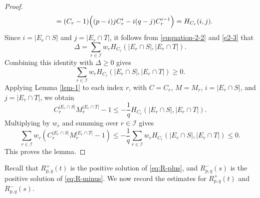 \documentclass[twoside,12pt]{article}
\numberwithin{equation}{section}
\begin{document}
\begin{proof}
\begin{equation}
\begin{aligned}
        &\qquad =
        (C_r-1)
        \Bigl((p-i)jC_r^i-i(q-j)C_r^{i-1}\Bigr)
        =
        H_{C_r}(i,j).
\end{aligned}
\end{equation}
Since $i=|E_r\cap S|$ and $j=|E_r\cap T|$, it follows from \eqref{euquation-2-2} and \eqref{e2-3} that 
$$\Delta
        =
        \sum_{r\in\mathcal I}
        w_r
        H_{C_r}(|E_r\cap S|,|E_r\cap T|).$$
Combining this identity with $\Delta\ge0$ gives
$$\sum_{r\in\mathcal I}
        w_r H_{C_r}(|E_r\cap S|,|E_r\cap T|)
        \ge0.$$
Applying Lemma \ref{lem-1} to each index $r$, with
$C=C_r$, $M=M_r$, $i=|E_r\cap S|$, and
        $j=|E_r\cap T|$,
we obtain
\[
        C_r^{|E_r\cap S|}M_r^{|E_r\cap T|}-1
        \le
        -\frac1q H_{C_r}(|E_r\cap S|,|E_r\cap T|).
\]
Multiplying by $w_r$ and summing over $r\in\mathcal I$ gives
\[
\sum_{r\in\mathcal I}
        w_r\left(C_r^{|E_r\cap S|}
        M_r^{|E_r\cap T|}-1\right)  \le
        -\frac1q
        \sum_{r\in\mathcal I}
        w_r H_{C_r}(|E_r\cap S|,|E_r\cap T|)
        \le0.
\]
This proves the lemma.
\end{proof}

Recall that
$R^+_{p,q}(t)$ is the positive solution of
\eqref{eq:R-plus}, and
 $R^-_{p,q}(s)$ is the positive solution of
\eqref{eq:R-minus}.
We now record the estimates for $R^+_{p,q}(t)$ and $R^-_{p,q}(s)$.
\end{document}
